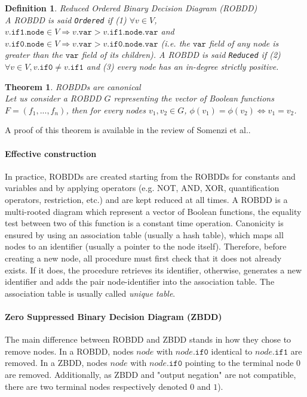 \documentclass[a4paper,10pt]{article}
\newcommand{\fieldVar}{\texttt{var}}
\newcommand{\fieldNode}{\texttt{node}}
\newcommand{\fieldThen}{\mathtt{if1}}
\newcommand{\fieldElse}{\mathtt{if0}}
\newtheorem{newtheo}{Theorem}
\newcommand{\theorem}[2]{\begin{newtheo}{\textsf{#1}\\} #2 \end{newtheo}}
\newtheorem{newdef}{Definition}
\newcommand{\definition}[2]{\begin{newdef}{#1\\}#2\end{newdef}}
\begin{document}
\definition{Reduced Ordered Binary Decision Diagram (ROBDD)}
{
A ROBDD is said \texttt{Ordered} if (1) $\forall v\in V$, $v.\fieldThen{}.\fieldNode{}\in V \Rightarrow v.\fieldVar{}> v.\fieldThen{}.\fieldNode{}.\fieldVar{}$ and $v.\fieldElse{}.\fieldNode{}\in V \Rightarrow v.\fieldVar{}> v.\fieldElse{}.\fieldNode{}.\fieldVar{}$ (i.e. the $\fieldVar{}$ field of any node is greater than the $\fieldVar{}$ field of its children).
A ROBDD is said \texttt{Reduced} if (2) $\forall v\in V, v.\fieldElse{} \neq v.\fieldThen{}$ and (3) every node has an in-degree strictly positive.
}

\theorem{ROBDDs are canonical}
{
Let us consider a ROBDD $G$ representing the vector of Boolean functions $F=(f_1, ..., f_n)$, then for every nodes $v_1, v_2 \in G$, $\phi(v_1) = \phi(v_2) \Leftrightarrow v_1 = v_2$.
}
A proof of this theorem is available in the review of Somenzi et al.\cite{Somenzi1999}.

\paragraph{Effective construction\\}
In practice, ROBDDs are created starting from the ROBDDs for constants and variables and by applying operators (e.g. NOT, AND, XOR, quantification operators, restriction, etc.) and are kept reduced at all times.
A ROBDD is a multi-rooted diagram which represent a vector of Boolean functions, the equality test between two of this function is a constant time operation.
Canonicity is ensured by using an association table (usually a hash table), which maps all nodes to an identifier (usually a pointer to the node itself).
Therefore, before creating a new node, all procedure must first check that it does not already exists. If it does, the procedure retrieves its identifier, otherwise, generates a new identifier and adds the pair node-identifier into the association table.
The association table is usually called \textit{unique table}.

\paragraph{Zero Suppressed Binary Decision Diagram (ZBDD)}
The main difference between ROBDD and ZBDD stands in how they chose to remove nodes.
In a ROBDD, nodes $node$ with $node.\fieldElse{}$ identical to $node.\fieldThen{}$ are removed.
In a ZBDD, nodes $node$ with $node.\fieldElse{}$ pointing to the terminal node $0$ are removed.
Additionally, as ZBDD and "output negation" are not compatible, there are two terminal nodes respectively denoted $0$ and $1$).
\end{document}
